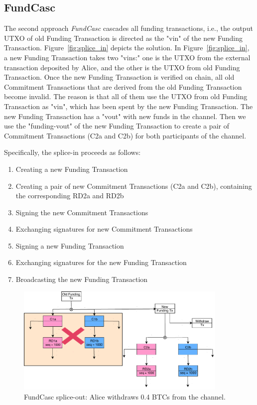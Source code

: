 \subsection{FundCasc}


The second approach {\em FundCasc} cascades all funding transactions, i.e., the output UTXO of old Funding Transaction is directed as the "vin" of the new Funding
Transaction. Figure~\ref{fig:splice_in} depicts the solution. In Figure~\ref{fig:splice_in}, a new Funding Transaction takes two "vins:" one is the UTXO from the external transaction deposited by Alice, and the other is the UTXO from old Funding Transaction. Once the new Funding Transaction is verified on chain, all old Commitment Transactions that are derived from the old Funding Transaction become invalid. The reason is that all of them use the UTXO from old Funding Transaction as "vin", which has been spent by the new Funding Transaction. The new Funding Transaction has a "vout" with new funds in the channel. Then we use the "funding-vout" of the new Funding Transaction to create a pair of Commitment Transactions (C2a and C2b) for both participants of the channel.


Specifically, the splice-in proceeds as follows:
\begin{enumerate}
\item Creating a new Funding Transaction
\item Creating a pair of new Commitment Transactions (C2a and C2b), containing the corresponding RD2a and RD2b
\item Signing the new Commitment Transactions
\item Exchanging signatures for new Commitment Transactions
\item Signing a new Funding Transaction
\item Exchanging signatures for the new Funding Transaction
\item Broadcasting the new Funding Transaction
\end{enumerate}

\begin{figure}[t]
\centering
\includegraphics[width=4in]{figs/splice_out.pdf}
\vspace{-6pt}
\caption{FundCasc splice-out: Alice withdraws 0.4 BTCs from the channel.}
\label{fig:splice_out}
\end{figure}


